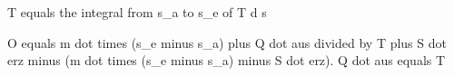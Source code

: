 T equals the integral from s_a to s_e of T d s  

O equals m dot times (s_e minus s_a) plus Q dot aus divided by T plus S dot erz minus (m dot times (s_e minus s_a) minus S dot erz). Q dot aus equals T